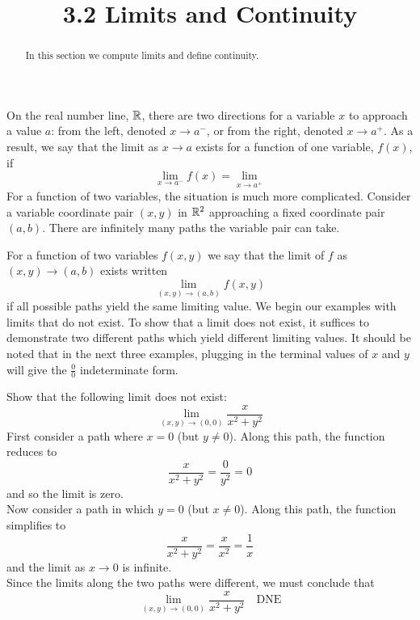 \documentclass[handout]{ximera}
\title{3.2 Limits and Continuity}
\begin{document}
\begin{abstract}
In this section we compute limits and define continuity.
\end{abstract}

\maketitle

On the real number line, $\mathbb R$, there are two directions for a variable $x$ to approach a value $a$: from 
the left, denoted $x \to a^-$, or from the right, denoted $x \to a^+$.
As a result, we say that the limit as $x \to a$ exists for a function of one variable, $f(x)$, if
\[
\lim_{x \to a^-} f(x) = \lim_{x \to a^+}
\]
For a function of two variables, the situation is much more complicated. 
Consider a variable coordinate pair $(x, y)$ in $\mathbb R^2$
approaching a fixed coordinate pair $(a,b)$.  There are infinitely many paths the variable pair can take.

\begin{image}
\end{image} 

For a function of two variables $f(x,y)$ we say that the limit of $f$ as $(x, y) \to (a,b)$ exists written
\[
\lim_{(x,y) \to (a,b)} f(x,y)
\]
if all possible paths yield the same limiting value. We begin our examples with limits that do not exist. 
To show that a limit does not exist, it suffices to demonstrate two different paths which yield different limiting values.
It should be noted that in the next three examples, plugging in the terminal values of $x$ and $y$ will 
give the $\frac00$ indeterminate form.

\begin{example}[Example 1]
Show that the following limit does not exist:
\[
\lim_{(x,y) \to (0,0)} \frac{x}{x^2 + y^2}
\]
First consider a path where $x = 0$ (but $y \neq 0$). Along this path, the function reduces to
\[
\frac{x}{x^2 + y^2} = \frac{0}{y^2} = 0
\]
and so the limit is zero.\\
Now consider a path in which $y = 0$ (but $x \neq 0$). Along this path, the function simplifies to
\[
\frac{x}{x^2 + y^2} = \frac{x}{x^2} = \frac{1}{x}
\]
and the limit as $x \to 0$ is infinite.\\
Since the limits along the two paths were different, we must conclude that
\[
\lim_{(x,y) \to (0,0)} \frac{x}{x^2 + y^2} \quad \text{DNE}
\]
\end{example}
\end{document}
